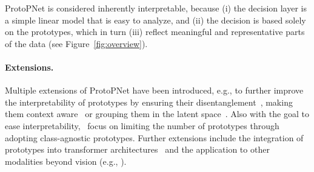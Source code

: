 ProtoPNet is considered inherently interpretable, because (i) the decision layer is a simple linear model that is easy to analyze, and (ii) the decision is based solely on the prototypes, which in turn (iii) reflect meaningful and representative parts of the data (see Figure~\ref{fig:overview}).

\paragraph{Extensions.}
Multiple extensions of ProtoPNet have been introduced, e.g., to further improve the interpretability of prototypes by ensuring their disentanglement~\citep{Wang_2021_InterpretableImageRecognition}, making them context aware~\citep{Donnelly_2022_DeformableProtoPNetInterpretable} or grouping them in the latent space~\citep{Ma_2023_ThisLooksThose}. 
Also with the goal to ease interpretability,~\citealt{Rymarczyk_2021_ProtoPSharePrototypicalParts,Nauta_2021_NeuralPrototypeTrees,Rymarczyk_2022_InterpretableImageClassification} focus on limiting the number of prototypes through adopting class-agnostic prototypes. 
Further extensions include the integration of prototypes into transformer architectures~\citep{Xue_2024_ProtoPFormerConcentratingPrototypical,Ma_2024_Interpretableimage} and the application to other modalities beyond vision (e.g., \citealt{Wang_2023_PROMINETPrototypebasedMultiView}).


